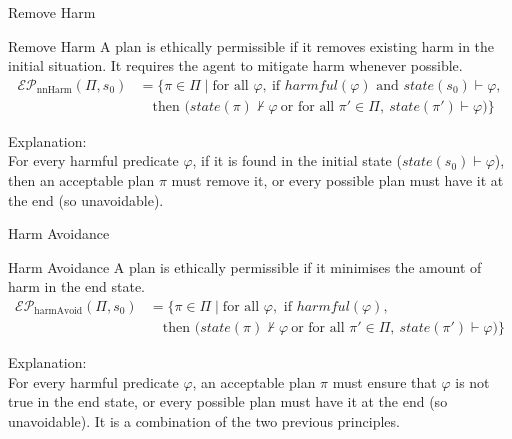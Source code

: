 \documentclass[compress,xcolor=table]{beamer}
\begin{document}
\begin{frame}{Remove Harm}
    \small
    \begin{block}{Remove Harm}
        A plan is ethically permissible if it removes existing harm in the initial situation. 
        It requires the agent to mitigate harm whenever possible.
        $$
    \begin{aligned}
    \mathcal{E}\mathcal{P}_{\text{nnHarm}}(\Pi, s_0)
    &= \{ \pi \in \Pi \mid \text{for all } \varphi,\ 
    \text{if } harmful(\varphi) \text{ and } state(s_0) \vdash \varphi, \\
    &\quad \text{then } \big(
        state(\pi) \not\vdash \varphi
        \ \text{or for all } \pi' \in \Pi,\ 
        state(\pi') \vdash \varphi
    \big) \}
    \end{aligned}
    $$
    \end{block}
    \pause
    Explanation:\\
    For every harmful predicate $\varphi$, if it is found in the initial state ($state(s_0) \vdash \varphi$),
    then an acceptable plan $\pi$ must remove it, or every possible plan must have it at the end (so unavoidable).
    
\end{frame}

\begin{frame}{Harm Avoidance}
    \small
    \begin{block}{Harm Avoidance}
        A plan is ethically permissible if it minimises the amount of harm in the end state.
        $$
        \begin{aligned}
        \mathcal{E}\mathcal{P}_{\text{harmAvoid}}(\Pi, s_0)
        &= \{ \pi \in \Pi \mid 
        \text{for all } \varphi, \text{ if } harmful(\varphi), \\
        &\quad \text{then } \big( state(\pi) \not\vdash \varphi 
        \ \text{or for all } \pi' \in \Pi,\ state(\pi') \vdash \varphi \big) \}
        \end{aligned}
        $$
    \end{block}
    \pause
    Explanation:\\
    For every harmful predicate $\varphi$, an acceptable plan $\pi$ must ensure that $\varphi$ is not true in the end state,
    or every possible plan must have it at the end (so unavoidable). It is a combination of the two previous principles.
\end{frame}
\end{document}
